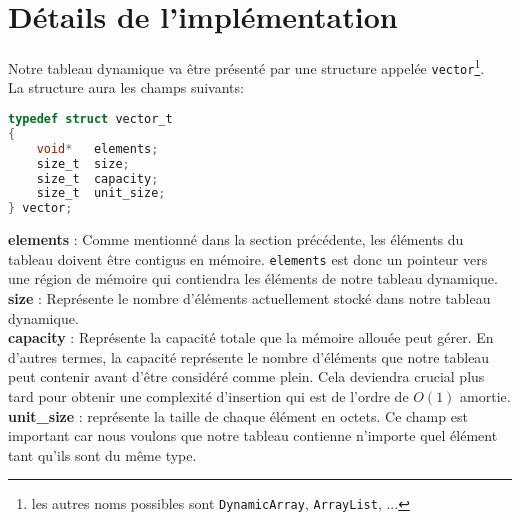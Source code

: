 \documentclass[a4paper]{article}
\begin{document}
	\section*{Détails de l'implémentation}
	Notre tableau dynamique va être présenté par une structure appelée \texttt{vector}\footnote{les autres noms possibles sont \texttt{DynamicArray}, \texttt{ArrayList}, ...}. \\
	La structure aura les champs suivants:
	\begin{lstlisting}[language=C]
typedef struct vector_t
{
	void* 	elements;
	size_t 	size;
	size_t 	capacity;
	size_t 	unit_size;
} vector;
	\end{lstlisting}
	\textbf{elements} : Comme mentionné dans la section précédente, les éléments du tableau doivent être contigus en mémoire. \texttt{elements} est donc un pointeur vers une région de mémoire qui contiendra les éléments de notre tableau dynamique.\\
	\textbf{size} : Représente le nombre d'éléments actuellement stocké dans notre tableau dynamique. \\
	\textbf{capacity} : Représente la capacité totale que la mémoire allouée peut gérer. En d'autres termes, la capacité représente le nombre d'éléments que notre tableau peut contenir avant d'être considéré comme plein. Cela deviendra crucial plus tard pour obtenir une complexité d'insertion qui est de l'ordre de $O(1)$ amortie. \\
	\textbf{unit\_size} : représente la taille de chaque élément en octets. Ce champ est important car nous voulons que notre tableau contienne n'importe quel élément tant qu'ils sont du même type. \\
	
\end{document}
